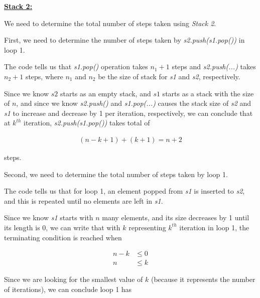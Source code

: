 \documentclass[12pt]{article}
\begin{document}
\begin{enumerate}[a.]
    \underline{\textbf{Stack 2:}}

    \bigskip

    We need to determine the total number of steps taken using \textit{Stack 2}.

    \bigskip

    First, we need to determine the number of steps taken by \textit{s2.push(s1.pop())} in loop 1.

    \bigskip

    The code tells us that \textit{s1.pop()} operation takes $n_1 + 1$ steps and
    \textit{s2.push(...)} takes $n_2 + 1$ steps, where $n_1$ and $n_2$
    be the size of stack for \textit{s1} and \textit{s2}, respectively.

    \bigskip

    Since we know $s2$ starts as an empty stack, and $s1$ starts as a stack
    with the size of $n$, and since we know \textit{s2.push()} and \textit{s1.pop(...)} causes the
    stack size of \textit{s2} and \textit{s1} to increase and decrease by 1 per iteration, respectively,
    we can conclude that at $k^{th}$ iteration, \textit{s2.push(s1.pop())}
    takes total of

    \begin{align}
        (n - k + 1) + (k + 1) = n + 2
    \end{align}

    steps.

    \bigskip

    Second, we need to determine the total number of steps taken by loop 1.

    \bigskip

    The code tells us that for loop 1, an element popped from \textit{s1} is inserted to \textit{s2},
    and this is repeated until no elements are left in \textit{s1}.

    \bigskip

    Since we know \textit{s1} starts with $n$ many elements, and its size decreases
    by 1 until its length is 0, we can write that with $k$ representing
    $k^{th}$ iteration in loop 1, the terminating condition is reached when

    \begin{align}
        n - k &\leq 0\\
        n &\leq k
    \end{align}

    \bigskip

    Since we are looking for the smallest value of $k$ (because it represents
    the number of iterations), we can conclude loop 1 has


\end{enumerate}
\end{document}
